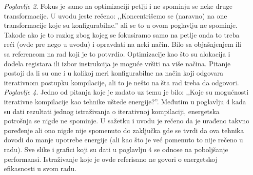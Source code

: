 \documentclass[a4paper]{report}
\begin{document}
\textit{Poglavlje 2.} Fokus je samo na optimizaciji petlji i ne spominju se neke druge transformacije. U uvodu jeste rečeno: ,,Koncentrišemo se (naravno) na one transformacije koje su konfigurabilne.'' ali se to u ovom poglavlju ne spominje. Takođe ako je to razlog zbog kojeg se fokusiramo samo na petlje onda to treba reći (ovde pre nego u uvodu) i opravdati na neki način. Bilo sa objašnjenjem ili sa referencom na rad koji je to potvrdio. Optimizacije kao što su alokacija i dodela registara ili izbor instrukcija je moguće vršiti na više načina. Pitanje postoji da li su one i u kolikoj meri konfigurabilne na način koji odgovara iterativnom postupku kompilacije, ali to je nešto na šta rad treba da odgovori. \\

\textit{Poglavlje 4.} Jedno od pitanja koje je zadato uz temu je bilo: ,,Koje su mogućnosti iterativne kompilacije kao tehnike uštede energije?''. Međutim u poglavlju 4 kada su dati rezultati jednog istraživanja o iterativnoj kompilaciji, energetska potrošnja se nigde ne spominje. U sažetku i uvodu je rečeno da je urađeno takvno poređenje ali ono nigde nije spomenuto do zaključka gde se tvrdi da ova tehnika dovodi do manje upotrebe energije (ali kao što je već pomenuto to nije rečeno u radu). Sve slike i grafici koji su dati u poglavlju 4 se odnose na poboljšanje performansi. Istraživanje koje je ovde referisano ne govori o energetskoj efikasnosti u svom radu. \\
\end{document}
